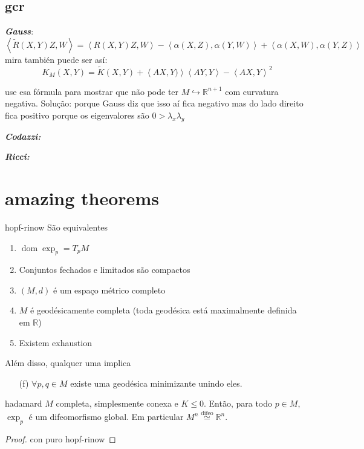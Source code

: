 \subsection{gcr}
\textit{\textbf{Gauss}}:
\[\left<\tilde{R}(X,Y)Z,W\right>=\left<R(X,Y)Z,W\right>-\left<\alpha(X,Z),\alpha(Y,W)\right>+\left<\alpha(X,W),\alpha(Y,Z)\right>\]
mira también puede ser así:
\[K_M(X,Y)=\tilde{K}(X,Y)+\left<AX,Y)\right>\left<AY,Y\right>-\left<AX,Y\right>^2\]
\begin{exercise}\leavevmode
use esa fórmula para mostrar que não pode ter \(M \hookrightarrow \mathbb{R}^{n+1}\) com curvatura negativa. Solução: porque Gauss diz que isso aí fica negativo mas do lado direito fica positivo porque os eigenvalores são \(0>\lambda_x\lambda_y\)
\end{exercise}

\textit{\textbf{Codazzi:}}

 \textit{\textbf{Ricci:}}

\section{amazing theorems}

\begin{thing6}{hopf-rinow}\leavevmode
São equivalentes
\begin{enumerate}[label=(\alph*)]
\item \(\operatorname{dom}\operatorname{exp}_p=T_pM\) 
\item Conjuntos fechados e limitados são compactos
\item \((M,d)\) é um espaço métrico completo
\item \(M\) é geodésicamente completa (toda geodésica está maximalmente definida em \(\mathbb{R}\))
\item Existem exhaustion
\end{enumerate}
Além disso, qualquer uma implica
\begin{enumerate}[label=(\alph*)]
	\item[(f)] \(\forall p,q \in M\) existe uma geodésica minimizante unindo eles.
\end{enumerate}
\end{thing6}

\begin{thing6}{hadamard}\leavevmode
\(M\) completa, simplesmente conexa e \(K \leq  0\). Então, para todo \(p \in M\), \(\operatorname{exp}_p\) é um difeomorfismo global. Em particular \(M^n \overset{\operatorname{difeo}}{\simeq} \mathbb{R}^n\).
\end{thing6}
\begin{proof}\leavevmode
con puro hopf-rinow
\end{proof}

